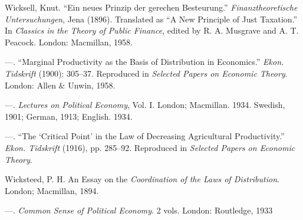 \documentclass{article}
\begin{document}
\begin{thebibliography}{00}
Wicksell, Knut. \foreignlanguage{english}{``Ein neues Prinzip der gerechen Besteurung.'' \emph{Finanztheoretische Untersuchungen}, Jena (1896). Translated as ``A New Principle of Just Taxation.'' In \emph{Classics in the Theory of Public Finance}, edited by R. A. Musgrave and A. T. Peacock. London: Macmillan, 1958.}

---. \foreignlanguage{english}{``Marginal Productivity as the Basis of Distribution in Economics.'' \emph{Ekon. Tidskrift} (1900): 305--37. Reproduced in \emph{Selected Papers on Economic Theory}. London: Allen \& Unwin, 1958.}

---. \foreignlanguage{english}{\emph{Lectures on Political Economy}, Vol. I. London; Macmillan. 1934. Swedish, 1901; German, 1913; English. 1934.}

---. \foreignlanguage{english}{``The `Critical Point' in the Law of Decreasing Agricultural Productivity.'' \emph{Ekon. Tidskrift} (1916), pp. 285--92. Reproduced in \emph{Selected Papers on Economic Theory}.}

Wicksteed, P. \foreignlanguage{english}{H. An Essay on the \emph{Coordination of the Laws of Distribution}. London; Macmillan, 1894.}

---. \emph{Common Sense of Political Economy}. 2 vols. London: Routledge, 1933

\end{thebibliography}
\end{document}
